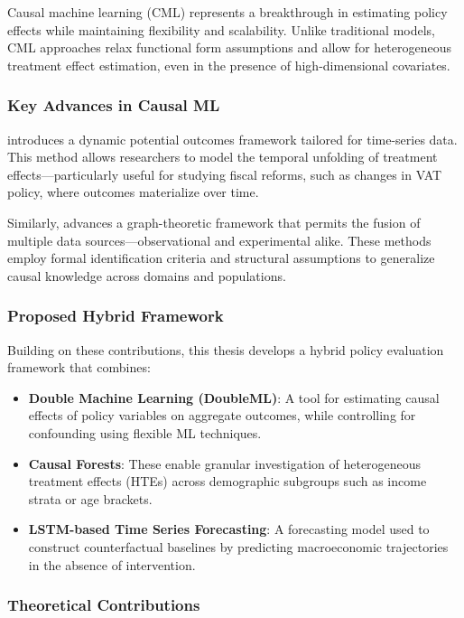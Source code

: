 Causal machine learning (CML) represents a breakthrough in estimating policy effects while maintaining flexibility and scalability. Unlike traditional models, CML approaches relax functional form assumptions and allow for heterogeneous treatment effect estimation, even in the presence of high-dimensional covariates.

\subsubsection{Key Advances in Causal ML}\label{subsubsec:advances}

\citet{shephard2023nonparametric} introduces a dynamic potential outcomes framework tailored for time-series data. This method allows researchers to model the temporal unfolding of treatment effects—particularly useful for studying fiscal reforms, such as changes in VAT policy, where outcomes materialize over time.

Similarly, \citet{bareinboim2023fusion} advances a graph-theoretic framework that permits the fusion of multiple data sources—observational and experimental alike. These methods employ formal identification criteria and structural assumptions to generalize causal knowledge across domains and populations.

\subsubsection{Proposed Hybrid Framework}\label{subsubsec:proposed}

Building on these contributions, this thesis develops a hybrid policy evaluation framework that combines:

\begin{itemize}
    \item \textbf{Double Machine Learning (DoubleML)}: A tool for estimating causal effects of policy variables on aggregate outcomes, while controlling for confounding using flexible ML techniques.
    \item \textbf{Causal Forests}: These enable granular investigation of heterogeneous treatment effects (HTEs) across demographic subgroups such as income strata or age brackets.
    \item \textbf{LSTM-based Time Series Forecasting}: A forecasting model used to construct counterfactual baselines by predicting macroeconomic trajectories in the absence of intervention.
\end{itemize}

\subsubsection{Theoretical Contributions}\label{subsubsec:theoretical}

